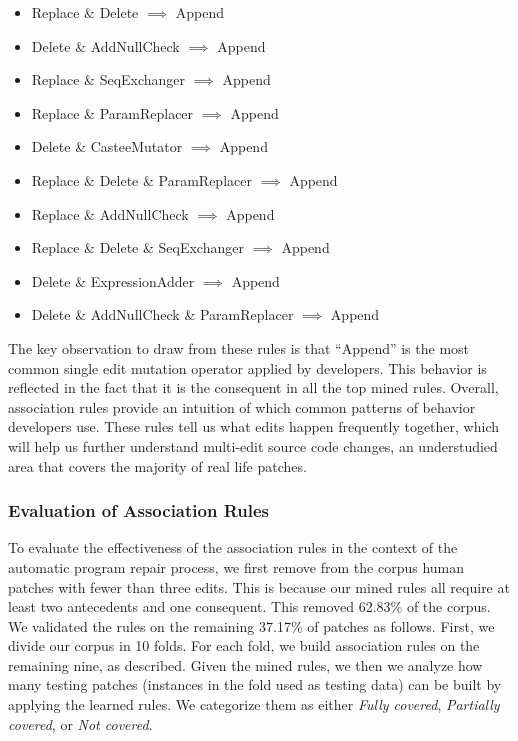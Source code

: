 \documentclass[conference]{IEEEtran}
\begin{document}
\hfill
\begin{itemize}
 \item Replace \& Delete $\implies$ Append
 \item Delete \& AddNullCheck $\implies$ Append
 \item Replace \& SeqExchanger $\implies$ Append
 \item Replace \& ParamReplacer $\implies$ Append
 \item Delete \& CasteeMutator $\implies$ Append
 \item Replace \& Delete \& ParamReplacer $\implies$ Append
 \item Replace \& AddNullCheck $\implies$ Append
 \item Replace \& Delete \& SeqExchanger $\implies$ Append
 \item Delete \& ExpressionAdder $\implies$ Append
 \item Delete \& AddNullCheck \& ParamReplacer $\implies$ Append
\end{itemize}
\hfill

The key observation to draw from these rules is that ``Append'' is the most
common single edit mutation operator applied by 
developers. This behavior is reflected in the fact that it is the consequent in
all the top mined rules.
Overall, association rules provide an intuition of which common patterns of behavior
developers use. These rules tell us what edits happen frequently together, which
will help us further understand multi-edit source code changes, an understudied 
area that covers the majority of real life patches.

\subsubsection{Evaluation of Association Rules}
To evaluate the effectiveness of the association rules in the context of the
automatic program repair process, we first remove from the corpus human patches
with fewer than three edits.  This is because 
our mined rules all require at least two
antecedents and one consequent. This removed 62.83\% of the
corpus. We validated the rules on the remaining 37.17\% of patches as follows.
First, we divide our 
corpus in 10 folds. For each fold, we build association rules on the remaining
nine, as described. Given the mined rules, we then we
analyze how many testing patches (instances in the fold used as testing data) can be
built by applying the learned rules.  We categorize them as either
\emph{Fully covered}, \emph{Partially covered}, or \emph{Not covered}.
\end{document}
